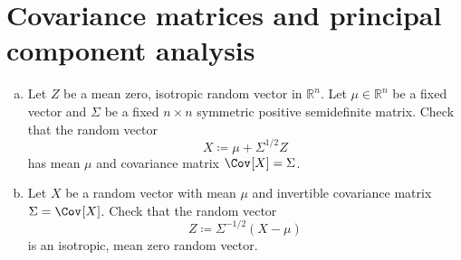\section{Covariance matrices and principal component analysis}
\begin{problem*}[Exercise 3.2.2]\label{ex3.2.2}
	\begin{enumerate}[(a)]
		\item\label{ex3.2.2:a} Let \(Z\) be a mean zero, isotropic random vector in \(\mathbb{R} ^n\). Let \(\mu \in \mathbb{R} ^n\) be a fixed vector and \(\Sigma \) be a fixed \(n \times n\) symmetric positive semidefinite matrix. Check that the random vector
		      \[
			      X \coloneqq \mu + \Sigma ^{1 / 2} Z
		      \]
		      has mean \(\mu \) and covariance matrix \(\Cov_{}[X] = \Sigma \).
		\item\label{ex3.2.2:b} Let \(X\) be a random vector with mean \(\mu \) and invertible covariance matrix \(\Sigma = \Cov_{}[X] \). Check that the random vector
		      \[
			      Z \coloneqq \Sigma ^{-1 / 2}(X - \mu )
		      \]
		      is an isotropic, mean zero random vector.
	\end{enumerate}
\end{problem*}
